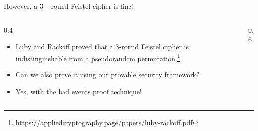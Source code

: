 \documentclass[aspectratio=169, lualatex, handout]{beamer}
\begin{document}
\begin{frame}{However, a 3+ round Feistel cipher is fine!}
	\begin{columns}[c]
		\begin{column}{0.4\textwidth}
			\begin{itemize}
				\item Luby and Rackoff proved that a 3-round Feistel cipher is indistinguishable from a pseudorandom permutation.\footnote{\url{https://appliedcryptography.page/papers/luby-rackoff.pdf}}
				\item Can we also prove it using our provable security framework?
				\item Yes, with the bad events proof technique!
			\end{itemize}
		\end{column}
		\begin{column}{0.6\textwidth}
			\begin{center}
			\end{center}
		\end{column}
	\end{columns}
\end{frame}
\end{document}
